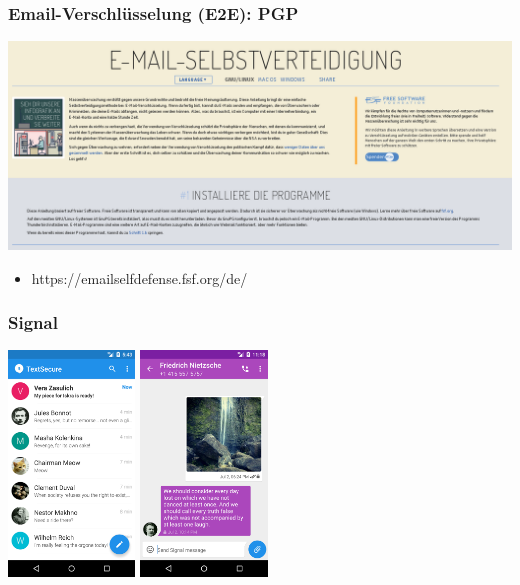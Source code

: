 \documentclass[12pt]{beamer}
\begin{document}
\begin{frame}
  \frametitle{Email-Verschlüsselung (E2E): PGP}
  \begin{center}
    \includegraphics[height=0.5\textheight]{img/emailselfdefense.png}
    \begin{itemize}
      \item https://emailselfdefense.fsf.org/de/
    \end{itemize}
  \end{center}
\end{frame}

\begin{frame}
  \frametitle{Signal}
    \begin{center}
      \includegraphics[height=6cm]{img/signal1.png}
      \hspace{0.5cm}
      \includegraphics[height=6cm]{img/signal2.png}
    \end{center}
\end{frame}
\end{document}
